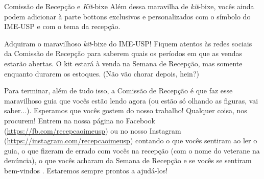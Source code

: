 \begin{secao}{Comissão de Recepção e \textit{Kit}-bixe}
Além dessa maravilha de \textit{kit}-bixe, vocês ainda podem adicionar à parte bottons
exclusivos e personalizados com o símbolo do IME-USP e com o tema da recepção.

Adquiram o maravilhoso \textit{kit}-bixe do IME-USP! Fiquem atentos às redes sociais da
Comissão de Recepção para saberem quais os períodos em que as vendas estarão abertas.
O kit estará à venda na Semana de Recepção, mas somente enquanto
durarem os estoques. (Não vão chorar depois, hein?)

Para terminar, além de tudo isso, a Comissão de Recepção é que faz esse maravilhoso guia que
vocês estão lendo agora (ou estão só olhando as figuras, vai
saber...). Esperamos que vocês gostem do nosso trabalho! Qualquer coisa, nos
procurem! Entrem na nossa página no Facebook (\url{https://fb.com/recepcaoimeusp}) ou no nosso
Instagram (\url{https://instagram.com/recepcaoimeusp}) contando
o que vocês sentiram ao ler o guia, o que fizeram de errado com vocês na
recepção (com o nome do veterane na denúncia), o que vocês acharam da Semana
de Recepção e se vocês se sentiram bem-vindos . Estaremos sempre prontos a ajudá-los!
\end{secao}
